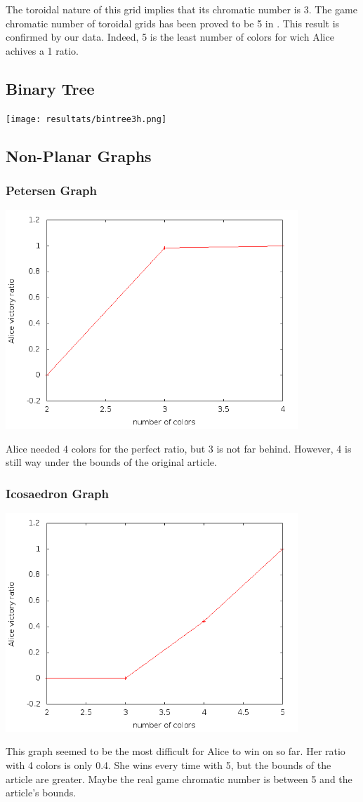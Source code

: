 The toroidal nature of this grid implies that its chromatic number is 3. The game chromatic number of toroidal grids has been proved to be 5 in \cite{Raspaud20091183}. This result is confirmed by our data. Indeed, 5 is the least number of colors for wich Alice achives a 1 ratio.

\subsection{Binary Tree}

\texttt{[image: resultats/bintree3h.png]}

\subsection{Non-Planar Graphs}

\subsubsection{Petersen Graph}

\includegraphics[width=11cm]{resultats/petersen.png}

Alice needed 4 colors for the perfect ratio, but 3 is not far behind. However, 4 is still way under the bounds of the original article.

\subsubsection{Icosaedron Graph}

\includegraphics[width=11cm]{resultats/icosaedre.png}

This graph seemed to be the most difficult for Alice to win on so far. Her ratio with 4 colors is only 0.4. She wins every time with 5, but the bounds of the article are greater. Maybe the real game chromatic number is between 5 and the article's bounds.